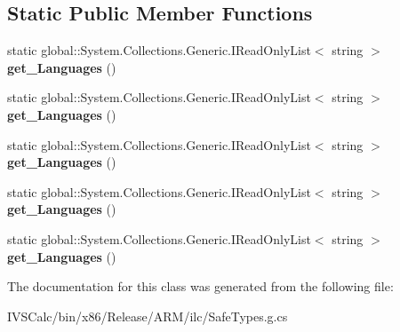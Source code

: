 \subsection*{Static Public Member Functions}
\begin{DoxyCompactItemize}
\item 
\mbox{\label{class_windows_1_1_system_1_1_user_profile_1_1_globalization_preferences_a280eca86acf48f0b63eb1480702fe598}} 
static global\+::\+System.\+Collections.\+Generic.\+I\+Read\+Only\+List$<$ string $>$ {\bfseries get\+\_\+\+Languages} ()
\item 
\mbox{\label{class_windows_1_1_system_1_1_user_profile_1_1_globalization_preferences_a280eca86acf48f0b63eb1480702fe598}} 
static global\+::\+System.\+Collections.\+Generic.\+I\+Read\+Only\+List$<$ string $>$ {\bfseries get\+\_\+\+Languages} ()
\item 
\mbox{\label{class_windows_1_1_system_1_1_user_profile_1_1_globalization_preferences_a280eca86acf48f0b63eb1480702fe598}} 
static global\+::\+System.\+Collections.\+Generic.\+I\+Read\+Only\+List$<$ string $>$ {\bfseries get\+\_\+\+Languages} ()
\item 
\mbox{\label{class_windows_1_1_system_1_1_user_profile_1_1_globalization_preferences_a280eca86acf48f0b63eb1480702fe598}} 
static global\+::\+System.\+Collections.\+Generic.\+I\+Read\+Only\+List$<$ string $>$ {\bfseries get\+\_\+\+Languages} ()
\item 
\mbox{\label{class_windows_1_1_system_1_1_user_profile_1_1_globalization_preferences_a280eca86acf48f0b63eb1480702fe598}} 
static global\+::\+System.\+Collections.\+Generic.\+I\+Read\+Only\+List$<$ string $>$ {\bfseries get\+\_\+\+Languages} ()
\end{DoxyCompactItemize}


The documentation for this class was generated from the following file\+:\begin{DoxyCompactItemize}
\item 
I\+V\+S\+Calc/bin/x86/\+Release/\+A\+R\+M/ilc/Safe\+Types.\+g.\+cs\end{DoxyCompactItemize}
